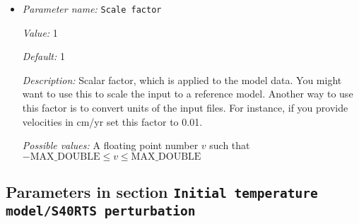 \begin{itemize}
{\it Possible values:} Any string
\item {\it Parameter name:} {\tt Scale factor}
\label{parameters:Initial temperature model/Patch on S40RTS/Ascii data model/Scale factor}
\label{parameters:Initial_20temperature_20model/Patch_20on_20S40RTS/Ascii_20data_20model/Scale_20factor}


{\it Value:} 1


{\it Default:} 1


{\it Description:} Scalar factor, which is applied to the model data. You might want to use this to scale the input to a reference model. Another way to use this factor is to convert units of the input files. For instance, if you provide velocities in cm/yr set this factor to 0.01.


{\it Possible values:} A floating point number $v$ such that $-\text{MAX\_DOUBLE} \leq v \leq \text{MAX\_DOUBLE}$
\end{itemize}

\subsection{Parameters in section \tt Initial temperature model/S40RTS perturbation}
\label{parameters:Initial_20temperature_20model/S40RTS_20perturbation}

